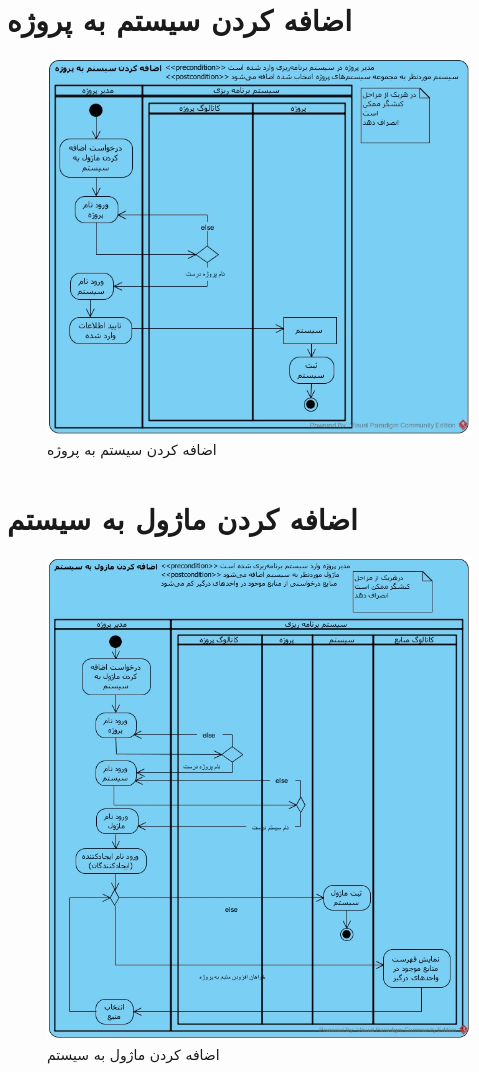 \section{اضافه کردن سیستم به پروژه}
\begin{figure}[H]
	\centering
	\includegraphics[scale=0.7]{img/activity/AddSystemToProject}
	\caption{اضافه کردن سیستم به پروژه}
\end{figure}

\section{اضافه کردن ماژول به سیستم}
\begin{figure}[H]
	\centering
	\includegraphics[scale=0.6]{img/activity/AddModuleToSystem}
	\caption{اضافه کردن ماژول به سیستم}
\end{figure}

